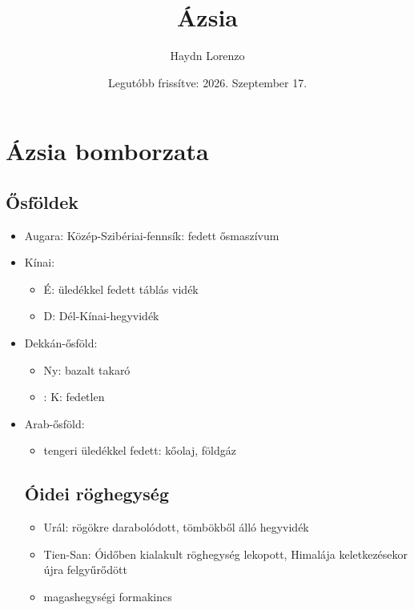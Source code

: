 \documentclass{article}
\title{Ázsia}
\author{Haydn Lorenzo}
\date{Legutóbb frissítve: 2026. Szeptember 17.}
\begin{document}
\maketitle
\tableofcontents
\newpage

\section{Ázsia bomborzata}
\subsection{Ősföldek}
\begin{itemize}
    \item Augara: Közép-Szibériai-fennsík: fedett ősmaszívum
    \item Kínai:\begin{itemize}
        \item É: üledékkel fedett táblás vidék
        \item D: Dél-Kínai-hegyvidék
    \end{itemize}
    \item Dekkán-ősföld: \begin{itemize}
        \item Ny: bazalt takaró
        \item: K: fedetlen
    \end{itemize}
    \item Arab-ősföld: \begin{itemize}
        \item tengeri üledékkel fedett: kőolaj, földgáz
    \end{itemize}
\subsection{Óidei röghegység}
\begin{itemize}
    \item Urál: rögökre darabolódott, tömbökből álló hegyvidék
    \item Tien-San: Óidőben kialakult röghegység lekopott, Himalája keletkezésekor újra felgyűrődött
    \item magashegységi formakincs
\end{itemize}
\end{itemize}
\end{document}
